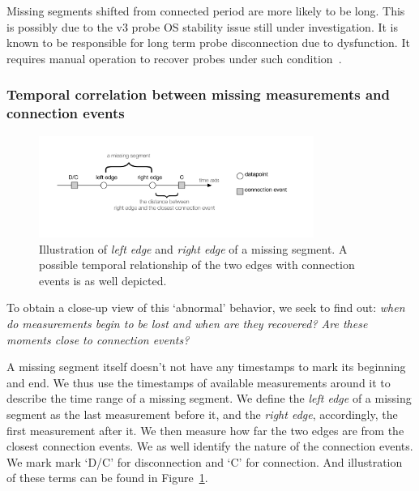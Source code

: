 Missing segments shifted from connected period are more likely to be long. This is possibly due to the v3 probe OS stability issue still under investigation. It is known to be responsible for long term probe disconnection due to dysfunction.
It requires manual operation to recover probes under such condition~\cite{usb, 1look, 2look, 3look}.


\subsubsection{Temporal correlation between missing measurements and connection events}
\begin{figure}[!htb]
\centering
\includegraphics[width=0.8\textwidth]{gfx/chap3/miss_seg_ill.pdf}
\caption{Illustration of \textit{left edge} and \textit{right edge} of a missing segment. A possible temporal relationship of the two edges with connection events is as well depicted.}
\label{fig:miss_seg_ill}
\end{figure}

To obtain a close-up view of this `abnormal' behavior, we seek to find out: \textit{when do measurements begin to be lost and when are they recovered? Are these moments close to connection events?}

A missing segment itself doesn't not have any timestamps to mark its beginning and end.
We thus use the timestamps of available measurements around it to describe the time range of a missing segment.
We define the \textit{left edge} of a missing segment as the last measurement before it, and the \textit{right edge}, accordingly, the first measurement after it.
We then measure how far the two edges are from the closest connection events.
We as well identify the nature of the connection events.
We mark mark `D/C' for disconnection and `C' for connection. 
And illustration of these terms can be found in Figure~\ref{fig:miss_seg_ill}.

